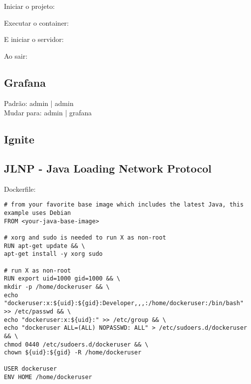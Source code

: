 \documentclass[a4paper,11pt]{article}
\begin{document}
Iniciar o projeto: \\
	
Executar o container: \\

E iniciar o servidor: \\

Ao sair: \\

\subsection{Grafana}

Padrão: admin | admin \\
Mudar para: admin | grafana

\subsection{Ignite}


\subsection{JLNP - Java Loading Network Protocol}
Dockerfile:
\begin{lstlisting}[]
# from your favorite base image which includes the latest Java, this example uses Debian
FROM <your-java-base-image>

# xorg and sudo is needed to run X as non-root
RUN apt-get update && \
apt-get install -y xorg sudo

# run X as non-root
RUN export uid=1000 gid=1000 && \
mkdir -p /home/dockeruser && \
echo "dockeruser:x:${uid}:${gid}:Developer,,,:/home/dockeruser:/bin/bash" >> /etc/passwd && \
echo "dockeruser:x:${uid}:" >> /etc/group && \
echo "dockeruser ALL=(ALL) NOPASSWD: ALL" > /etc/sudoers.d/dockeruser && \
chmod 0440 /etc/sudoers.d/dockeruser && \
chown ${uid}:${gid} -R /home/dockeruser

USER dockeruser
ENV HOME /home/dockeruser
\end{lstlisting}
\end{document}

